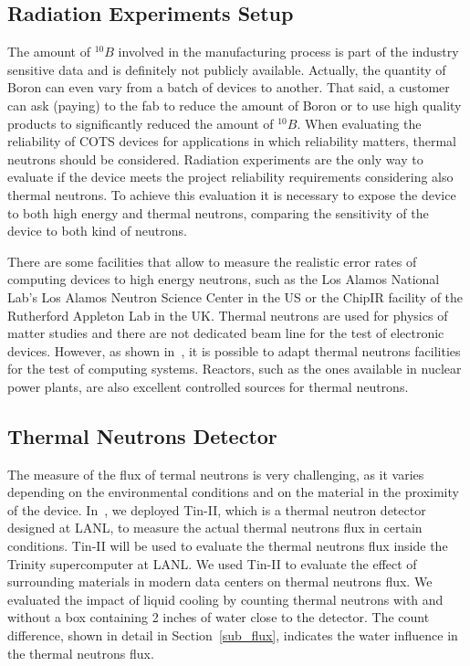 \subsection{Radiation Experiments Setup}
\label{sub_beam_setup}

The amount of $^{10}B$ involved in the manufacturing process is part of the industry sensitive data and is definitely not publicly available. Actually, the quantity of Boron can even vary from a batch of devices to another. That said, a customer can ask (paying) to the fab to reduce the amount of Boron or to use high quality products to significantly reduced the amount of $^{10}B$. When evaluating the reliability of COTS devices for applications in which reliability matters, thermal neutrons should be considered. Radiation experiments are the only way to evaluate if the device meets the project reliability requirements considering also thermal neutrons. To achieve this evaluation it is necessary to expose the device to both high energy and thermal neutrons, comparing the sensitivity of the device to both kind of neutrons.

There are some facilities that allow to measure the realistic error rates of computing devices to high energy neutrons, such as the Los Alamos National Lab's Los Alamos Neutron Science Center in the US or the ChipIR facility of the Rutherford Appleton Lab in the UK. Thermal neutrons are used for physics of matter studies and there are not dedicated beam line for the test of electronic devices. However, as shown in~\cite{jsc2020}, it is possible to adapt thermal neutrons facilities for the test of computing systems. Reactors, such as the ones available in nuclear power plants, are also excellent controlled sources for thermal neutrons.

\subsection{Thermal Neutrons Detector}
\label{sub_detector}

The measure of the flux of termal neutrons is very challenging, as it varies depending on the environmental conditions and on the material in the proximity of the device. In~\cite{jsc2020}, we deployed Tin-II, which is a thermal neutron detector designed at LANL,  to measure the actual thermal neutrons flux in certain conditions. Tin-II will be used to evaluate the thermal neutrons flux inside the Trinity supercomputer at LANL.  We used Tin-II to evaluate the effect of surrounding materials in modern data centers on thermal neutrons flux. We evaluated the impact of liquid cooling by counting thermal neutrons with and without a box containing 2 inches of water close to the detector. The count difference, shown in detail in Section~\ref{sub_flux}, indicates the water influence in the thermal neutrons flux.

